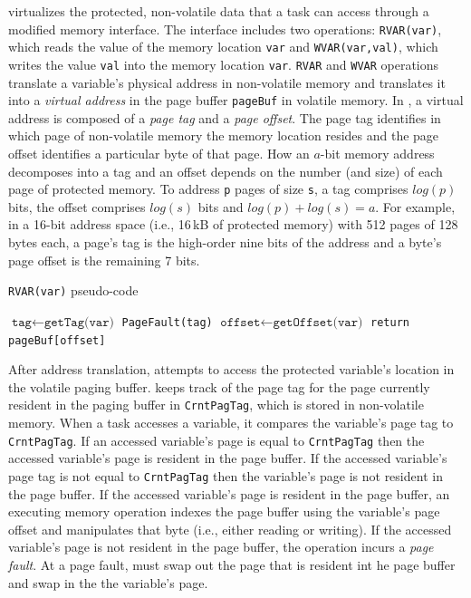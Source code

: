 \sys virtualizes the protected, non-volatile data that a task can access through a modified memory interface. The interface includes two operations: \texttt{RVAR(var)}, which reads the value of the memory location {\tt var} and \texttt{WVAR(var,val)}, which writes the value {\tt val} into the memory location {\tt var}. {\tt RVAR} and {\tt WVAR} operations translate a variable's physical address in non-volatile memory and translates it into a \emph{virtual address} in the page buffer \texttt{pageBuf} in volatile memory.  In \sys, a virtual address is composed of a \emph{page tag} and a \emph{page offset}. The page tag identifies in which page of non-volatile memory the memory location resides and
the page offset identifies a particular byte of that page. How an $a$-bit memory address decomposes into a tag and an offset depends on the number (and size) of each page of protected memory. To address {\tt p} pages of size {\tt s}, a tag comprises $log(p)$ bits, the offset comprises $log(s)$ bits and $log(p) + log(s) = a$. For example, in a 16-bit address space (i.e., 16\,kB of protected memory) with 512 pages of 128 bytes each, a
page's tag is the high-order nine bits of the address and a byte's page offset
is the remaining 7 bits.

\begin{algorithm}[t]
	\caption{\texttt{RVAR(var)} pseudo-code}
	\label{algo:rwar}
	\scriptsize
	\begin{algorithmic}[1]
		\State $\texttt{tag}\leftarrow \texttt{getTag(var)}$ 
			
		\State	\texttt{PageFault(tag)} 
		\EndIf
				\State $\texttt{offset}\leftarrow \texttt{getOffset(var)}$ 		
		\State \texttt{return pageBuf[offset]}  
	\end{algorithmic}
\end{algorithm}

After address translation, \sys attempts to access the protected variable's location in the volatile paging buffer. \sys keeps track of the page tag for the page currently resident in the paging buffer in {\tt CrntPagTag}, which is stored in non-volatile memory. When a task accesses a variable, it compares the variable's page tag to {\tt CrntPagTag}.  If an accessed variable's page is equal to {\tt CrntPagTag} then the accessed variable's page is resident in the page buffer. If the accessed variable's page tag is not equal to {\tt CrntPagTag} then the variable's page is not resident in the page buffer. If the accessed variable's page is resident in the page buffer, an executing memory operation indexes the page buffer using the variable's page offset and manipulates that byte (i.e., either reading or writing). If the accessed variable's page is not resident in the page buffer, the operation incurs a {\em page fault}. At a page fault, \sys must swap out the
page that is resident int he page buffer and swap in the the variable's page.

